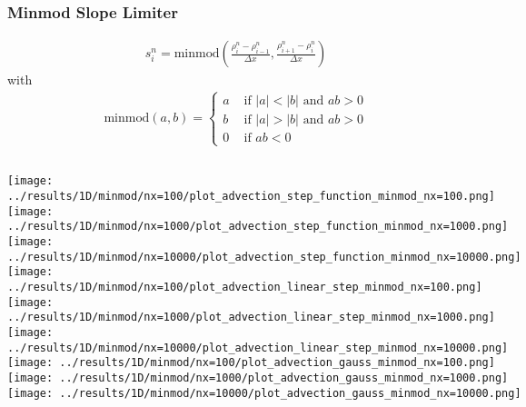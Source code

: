 
\begin{frame}
	\frametitle{Minmod Slope Limiter}
	
	\begin{align*}
		s_i^n = \mathrm{minmod} \left( \frac{\rho_i^n - \rho_{i-1}^n}{\Delta x}, \frac{\rho_{i+1}^n - \rho_i^n}{\Delta x} \right)
	\end{align*}
	with
	\begin{align*}
		\mathrm{minmod}(a, b) = \begin{cases}
		 	a & \text{ if } |a| < |b| \text{ and } ab > 0\\		
		 	b & \text{ if } |a| > |b| \text{ and } ab > 0\\
			0 & \text{ if } ab < 0
								\end{cases}
	\end{align*}
\end{frame}






\begin{frame}
	\vspace{10pt}
	\begin{columns}
			\centering
			\texttt{[image: ../results/1D/minmod/nx=100/plot\_advection\_step\_function\_minmod\_nx=100.png]}\\
			\texttt{[image: ../results/1D/minmod/nx=1000/plot\_advection\_step\_function\_minmod\_nx=1000.png]}\\
			\texttt{[image: ../results/1D/minmod/nx=10000/plot\_advection\_step\_function\_minmod\_nx=10000.png]}
			\centering
			\texttt{[image: ../results/1D/minmod/nx=100/plot\_advection\_linear\_step\_minmod\_nx=100.png]}\\
			\texttt{[image: ../results/1D/minmod/nx=1000/plot\_advection\_linear\_step\_minmod\_nx=1000.png]}\\
			\texttt{[image: ../results/1D/minmod/nx=10000/plot\_advection\_linear\_step\_minmod\_nx=10000.png]}
			\centering
			\texttt{[image: ../results/1D/minmod/nx=100/plot\_advection\_gauss\_minmod\_nx=100.png]}\\
			\texttt{[image: ../results/1D/minmod/nx=1000/plot\_advection\_gauss\_minmod\_nx=1000.png]}\\
			\texttt{[image: ../results/1D/minmod/nx=10000/plot\_advection\_gauss\_minmod\_nx=10000.png]}
	\end{columns}
\end{frame}

